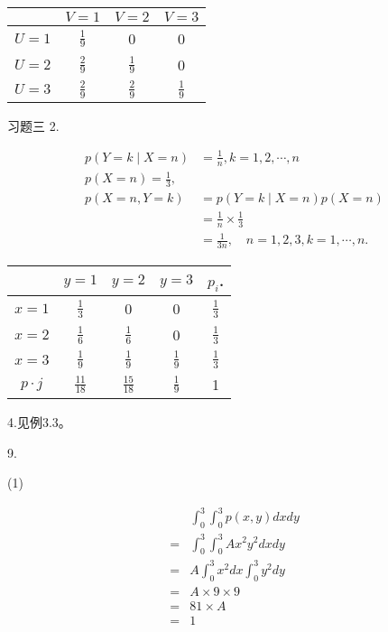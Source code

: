 \documentclass[14pt]{scrartcl} %
\numberwithin{equation}{section} %
\numberwithin{figure}{section} %
\numberwithin{table}{section} %
\begin{document}
	\begin{center}
		\begin{tabular}{c|c|c|c}
			& $V=1$ & $V=2$ & $V=3$ \\
			\hline
			$U=1$ & $\frac{1}{9}$ & 0 & 0 \\
			\hline
			$U=2$ & $\frac{2}{9}$ & $\frac{1}{9}$ & 0 \\
			\hline
			$U=3$ & $\frac{2}{9}$ & $\frac{2}{9}$ & $\frac{1}{9}$ \\
			\hline
		\end{tabular}
	\end{center}
	习题三
	2.
	
	$$
	\begin{aligned}
		p(Y=k \mid X=n) & =\frac{1}{n}, k=1,2, \cdots, n \\
		p(X=n)=\frac{1}{3}, & \\
		p(X=n, Y=k) & =p(Y=k \mid X=n) p(X=n) \\
		& =\frac{1}{n} \times \frac{1}{3} \\
		& =\frac{1}{3 n}, \quad n=1,2,3, k=1, \cdots, n .
	\end{aligned}
	$$
	\begin{center}
		\begin{tabular}{c|c|c|c|c}
			& $y=1$ & $y=2$ & $y=3$ & $p_{i}$. \\
			\hline
			$x=1$ & $\frac{1}{3}$ & 0 & 0 & $\frac{1}{3}$ \\
			\hline
			$x=2$ & $\frac{1}{6}$ & $\frac{1}{6}$ & 0 & $\frac{1}{3}$ \\
			\hline
			$x=3$ & $\frac{1}{9}$ & $\frac{1}{9}$ & $\frac{1}{9}$ & $\frac{1}{3}$ \\
			\hline
			$p \cdot j$ & $\frac{11}{18}$ & $\frac{15}{18}$ & $\frac{1}{9}$ & 1 \\
			\hline
		\end{tabular}
	\end{center}
	
	4.见例3.3。
	
	9.
	
	(1)
	
	$$
	\begin{aligned}
		& \int_{0}^{3} \int_{0}^{3} p(x, y) d x d y\\
		= &\int_{0}^{3} \int_{0}^{3} A x^{2} y^{2} d x d y \\
		= & A \int_{0}^{3} x^{2} d x \int_{0}^{3} y^{2} d y \\
		= & A \times 9 \times 9 \\
		= & 81 \times A \\
		= & 1
	\end{aligned}
	$$
	
\end{document}
